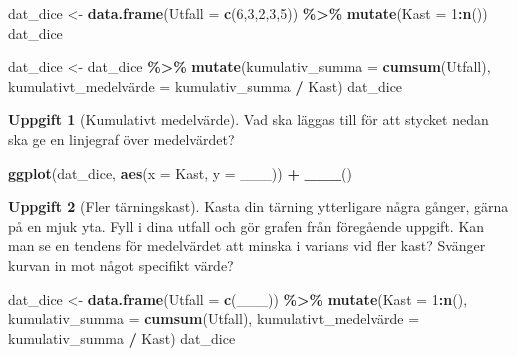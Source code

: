 \documentclass[
]{book}
\newenvironment{Shaded}{\begin{snugshade}}{\end{snugshade}}
\newcommand{\AttributeTok}[1]{\textcolor[rgb]{0.13,0.29,0.53}{#1}}
\newcommand{\DecValTok}[1]{\textcolor[rgb]{0.00,0.00,0.81}{#1}}
\newcommand{\FunctionTok}[1]{\textcolor[rgb]{0.13,0.29,0.53}{\textbf{#1}}}
\newcommand{\NormalTok}[1]{#1}
\newcommand{\OtherTok}[1]{\textcolor[rgb]{0.56,0.35,0.01}{#1}}
\newcommand{\SpecialCharTok}[1]{\textcolor[rgb]{0.81,0.36,0.00}{\textbf{#1}}}
\theoremstyle{definition}
\theoremstyle{definition}
\theoremstyle{definition}
\newtheorem{exercise}{Uppgift}[chapter]
\theoremstyle{definition}
\theoremstyle{remark}
\begin{document}
\begin{Shaded}
\begin{Highlighting}[]
\NormalTok{dat\_dice }\OtherTok{\textless{}{-}} \FunctionTok{data.frame}\NormalTok{(}\AttributeTok{Utfall =} \FunctionTok{c}\NormalTok{(}\DecValTok{6}\NormalTok{,}\DecValTok{3}\NormalTok{,}\DecValTok{2}\NormalTok{,}\DecValTok{3}\NormalTok{,}\DecValTok{5}\NormalTok{)) }\SpecialCharTok{\%\textgreater{}\%}
  \FunctionTok{mutate}\NormalTok{(}\AttributeTok{Kast =} \DecValTok{1}\SpecialCharTok{:}\FunctionTok{n}\NormalTok{())                           }
\NormalTok{dat\_dice}

\NormalTok{dat\_dice }\OtherTok{\textless{}{-}}\NormalTok{ dat\_dice }\SpecialCharTok{\%\textgreater{}\%}
  \FunctionTok{mutate}\NormalTok{(}\AttributeTok{kumulativ\_summa =} \FunctionTok{cumsum}\NormalTok{(Utfall),  }
\NormalTok{         kumulativt\_medelvärde }\OtherTok{=}\NormalTok{ kumulativ\_summa }\SpecialCharTok{/}\NormalTok{ Kast)}
\NormalTok{dat\_dice}
\end{Highlighting}
\end{Shaded}

\begin{exercise}[Kumulativt medelvärde]

Vad ska läggas till för att stycket nedan ska ge en linjegraf över medelvärdet?

\begin{Shaded}
\begin{Highlighting}[]
\FunctionTok{ggplot}\NormalTok{(dat\_dice, }\FunctionTok{aes}\NormalTok{(}\AttributeTok{x =}\NormalTok{ Kast, }\AttributeTok{y =}\NormalTok{ \_\_\_)) }\SpecialCharTok{+}
  \FunctionTok{\_\_\_}\NormalTok{()}
\end{Highlighting}
\end{Shaded}

\end{exercise}

\begin{exercise}[Fler tärningskast]

Kasta din tärning ytterligare några gånger, gärna på en mjuk yta. Fyll i dina utfall och gör grafen från föregående uppgift. Kan man se en tendens för medelvärdet att minska i varians vid fler kast? Svänger kurvan in mot något specifikt värde?

\begin{Shaded}
\begin{Highlighting}[]
\NormalTok{dat\_dice }\OtherTok{\textless{}{-}} \FunctionTok{data.frame}\NormalTok{(}\AttributeTok{Utfall =} \FunctionTok{c}\NormalTok{(\_\_\_)) }\SpecialCharTok{\%\textgreater{}\%} 
  \FunctionTok{mutate}\NormalTok{(}\AttributeTok{Kast =} \DecValTok{1}\SpecialCharTok{:}\FunctionTok{n}\NormalTok{(),                                 }
         \AttributeTok{kumulativ\_summa =} \FunctionTok{cumsum}\NormalTok{(Utfall),           }
\NormalTok{         kumulativt\_medelvärde }\OtherTok{=}\NormalTok{ kumulativ\_summa }\SpecialCharTok{/}\NormalTok{ Kast)}
\NormalTok{dat\_dice}
\end{Highlighting}
\end{Shaded}

\end{exercise}
\end{document}
